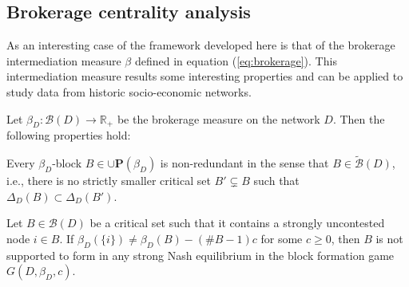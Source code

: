 \subsection{Brokerage centrality analysis}

As an interesting case of the framework developed here is that of the brokerage intermediation measure $\beta$ defined in equation (\ref{eq:brokerage}). This intermediation measure results some interesting properties and can be applied to study data from historic socio-economic networks.
\begin{theorem} \label{thm:beta-block}
Let $\beta_D \colon \mathcal{B} (D) \to \mathbb{R}_+$ be the brokerage measure on the network $D$. Then the following properties hold:
\begin{numm}
\item Every $\beta_D$-block $B \in \cup \mathbf{P} (\beta_D)$ is non-redundant in the sense that $B \in \widetilde{\mathcal{B}} (D)$, i.e., there is no strictly smaller critical set $B' \subsetneq B$ such that $\Delta_D (B) \subset \Delta_D (B')$.

\item Let $B \in \mathcal{B} (D)$ be a critical set such that it contains a strongly uncontested node $i \in B$. If $\beta_D (\{ i \}) \neq \beta_D (B) - (\# B-1) c$ for some $c \geqslant 0$, then $B$ is not supported to form in any strong Nash equilibrium in the block formation game $G (D, \beta_D ,c)$.
\end{numm}
\end{theorem}
